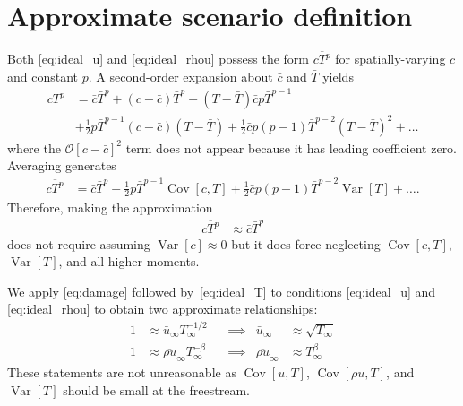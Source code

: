 \documentclass[letterpaper,11pt,nointlimits,reqno]{amsart}
\newcommand{\Cov}[2]{\ensuremath{\operatorname{Cov}\left[{#1},{#2}\right]}}
\newcommand{\Var}[1]{\ensuremath{\operatorname{Var}\left[{#1}\right]}}
\begin{document}
\section{Approximate scenario definition}

Both \eqref{eq:ideal_u} and \eqref{eq:ideal_rhou} possess the form $\overline{c
T^p}$ for spatially-varying $c$ and constant $p$.  A second-order expansion
about $\bar{c}$ and $\bar{T}$ yields
\begin{align}
  c T^p &= \bar{c} \bar{T}^p
         + \left(c - \bar{c}\right) \bar{T}^p
         + \left(T - \bar{T}\right) \bar{c} p \bar{T}^{p-1}
\\      &+ \frac{1}{2} p \bar{T}^{p-1} \left(c - \bar{c}\right)\left(T - \bar{T}\right)
         + \frac{1}{2} \bar{c} p \left(p-1\right) \bar{T}^{p-2} \left(T - \bar{T}\right)^2
         + \dots
\end{align}
where the $\mathcal{O}\left[c - \bar{c}\right]^2$ term does not appear because it
has leading coefficient zero.  Averaging generates
\begin{align}
  \overline{c T^p} &= \bar{c} \bar{T}^p
                    + \frac{1}{2} p \bar{T}^{p-1} \Cov{c}{T}
                    + \frac{1}{2} \bar{c} p \left(p-1\right) \bar{T}^{p-2} \Var{T}
                    + \dots
.
\end{align}
Therefore, making the approximation
\begin{align}
  \label{eq:damage}
  \overline{c T^p} &\approx \bar{c} \bar{T}^p
\end{align}
does not require assuming $\Var{c} \approx 0$ but it does force neglecting
$\Cov{c}{T}$, $\Var{T}$, and all higher moments.

We apply \eqref{eq:damage} followed by~\eqref{eq:ideal_T} to conditions
\eqref{eq:ideal_u} and \eqref{eq:ideal_rhou} to obtain two approximate
relationships:
\begin{align}
  \label{eq:approx_u}
  1 &\approx \bar{u}_\infty T_\infty^{-1/2}
  & &\implies
  & \bar{u}_\infty &\approx \sqrt{T_\infty}
\\
  \label{eq:approx_rhou}
  1 &\approx \overline{\rho u}_\infty T_\infty^{-\beta}
  & &\implies
  & \overline{\rho u}_\infty &\approx T_\infty^\beta
\end{align}
These statements are not unreasonable as $\Cov{u}{T}$, $\Cov{\rho u}{T}$, and
$\Var{T}$ should be small at the freestream.
\end{document}
